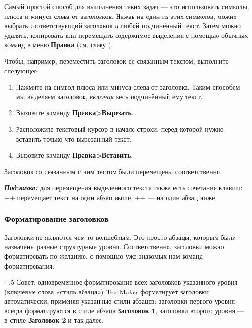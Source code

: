 ﻿\documentclass[a4paper,10pt]{article}
\makeatletter
\renewcommand\paragraph{%
   \@startsection{paragraph}{4}{0mm}%
      {-\baselineskip}%
      {.5\baselineskip}%
      {\normalfont\normalsize\bfseries}}
\makeatother
\begin{document}
Самый простой способ для выполнения таких задач — это использовать символы плюса и минуса слева от заголовков. Нажав на один из этих символов, можно выбрать соответствующий заголовок \textit{и} любой подчинённый текст. Затем можно удалять, копировать или перемещать содержимое выделения с помощью обычных команд в меню \textbf{Правка} (см. главу ).

Чтобы, например, переместить заголовок со связанным текстом, выполните следующее:

\begin{enumerate}
 \item Нажмите на символ плюса или минуса слева от заголовка. Таким способом мы выделяем заголовок, \textit{включая} весь подчинённый ему текст.
 \item Вызовите команду \textbf{Правка>Вырезать}.
 \item Расположите текстовый курсор в начале строки, перед которой нужно вставить только что вырезанный текст.
 \item Вызовите команду \textbf{Правка>Вставить}.
\end{enumerate}

Заголовок со связанным с ним тестом были перемещены соответственно.

\begin{mdframed}[backgroundcolor=blue!10]
\textbf{\textit{Подсказка:}} для перемещения выделенного текста также есть сочетания клавиш: ++\keys{\arrowkeyup} перемещает текст на один абзац выше, ++\keys{\arrowkeydown} — на один абзац ниже.
\end{mdframed}

\subsubsection{Форматирование заголовков}
Заголовки не являются чем-то волшебным. Это просто абзацы, которым были назначены разные структурные уровни. Соответственно, заголовки можно форматировать по желанию, с помощью уже знакомых нам команд форматирования.

\paragraph{Совет: одновременное форматирование всех заголовков указанного уровня (ключевые слова «стиль абзаца»)}
TextMaker форматирует заголовки автоматически, применяя указанные стили абзацев: заголовки первого уровня всегда форматируются в стиле абзаца \textbf{Заголовок 1}, заголовки второго уровня — в стиле \textbf{Заголовок 2} и так далее.
\end{document}
